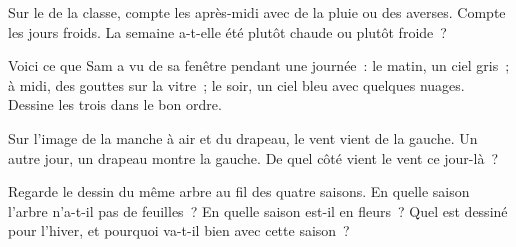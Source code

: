 \begin{exercise}[$\star\star$]\label{exo:g1:watching-the-weather:8}
Sur le  de la classe, compte les après-midi avec de la pluie
ou des averses. Compte les jours froids. La semaine a-t-elle été plutôt
chaude ou plutôt froide~?
\end{exercise}

\begin{exercise}[$\star\star$]\label{exo:g1:watching-the-weather:9}
Voici ce que Sam a vu de sa fenêtre pendant une journée~: le matin, un ciel
gris~; à midi, des gouttes sur la vitre~; le soir, un ciel bleu avec
quelques nuages. Dessine les trois  dans le bon ordre.
\end{exercise}

\begin{exercise}[$\star\star$]\label{exo:g1:watching-the-weather:10}
Sur l'image de la manche à air et du drapeau, le vent vient de la gauche.
Un autre jour, un drapeau montre la gauche. De quel côté vient le vent ce
jour-là~?
\end{exercise}

\begin{exercise}[$\star\star$]\label{exo:g1:watching-the-weather:11}
Regarde le dessin du même arbre au fil des quatre saisons. En quelle saison
l'arbre n'a-t-il pas de feuilles~? En quelle saison est-il en fleurs~?
Quel  est dessiné pour l'hiver, et pourquoi va-t-il bien avec
cette saison~?
\end{exercise}
